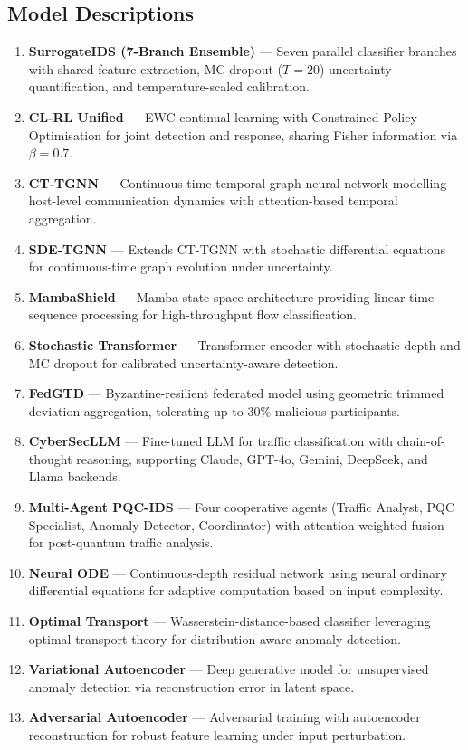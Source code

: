 \documentclass[11pt,a4paper]{article}
\begin{document}
\subsection{Model Descriptions}
\begin{enumerate}[leftmargin=*,label=\textbf{\arabic*.}]
  \item \textbf{SurrogateIDS (7-Branch Ensemble)} --- Seven parallel classifier branches with shared feature extraction, MC dropout ($T{=}20$) uncertainty quantification, and temperature-scaled calibration.
  \item \textbf{CL-RL Unified} --- EWC continual learning with Constrained Policy Optimisation for joint detection and response, sharing Fisher information via $\beta{=}0.7$.
  \item \textbf{CT-TGNN} --- Continuous-time temporal graph neural network modelling host-level communication dynamics with attention-based temporal aggregation.
  \item \textbf{SDE-TGNN} --- Extends CT-TGNN with stochastic differential equations for continuous-time graph evolution under uncertainty.
  \item \textbf{MambaShield} --- Mamba state-space architecture providing linear-time sequence processing for high-throughput flow classification.
  \item \textbf{Stochastic Transformer} --- Transformer encoder with stochastic depth and MC dropout for calibrated uncertainty-aware detection.
  \item \textbf{FedGTD} --- Byzantine-resilient federated model using geometric trimmed deviation aggregation, tolerating up to 30\% malicious participants.
  \item \textbf{CyberSecLLM} --- Fine-tuned LLM for traffic classification with chain-of-thought reasoning, supporting Claude, GPT-4o, Gemini, DeepSeek, and Llama backends.
  \item \textbf{Multi-Agent PQC-IDS} --- Four cooperative agents (Traffic Analyst, PQC Specialist, Anomaly Detector, Coordinator) with attention-weighted fusion for post-quantum traffic analysis.
  \item \textbf{Neural ODE} --- Continuous-depth residual network using neural ordinary differential equations for adaptive computation based on input complexity.
  \item \textbf{Optimal Transport} --- Wasserstein-distance-based classifier leveraging optimal transport theory for distribution-aware anomaly detection.
  \item \textbf{Variational Autoencoder} --- Deep generative model for unsupervised anomaly detection via reconstruction error in latent space.
  \item \textbf{Adversarial Autoencoder} --- Adversarial training with autoencoder reconstruction for robust feature learning under input perturbation.
\end{enumerate}
\end{document}
